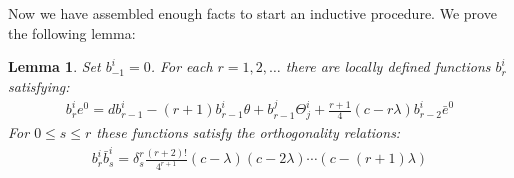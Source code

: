 \documentclass[11pt]{amsart}
\newtheorem{lem}[subsection]{Lemma}
\theoremstyle{definition}
\theoremstyle{definition}
\begin{document}
Now we have assembled enough facts to start an inductive procedure.  We prove the following lemma:

\begin{lem} Set $b^i_{-1} = 0$. For each $r = 1,2, \ldots$ there are locally defined functions $b^i_r$ satisfying:
%
\begin{align}
b^i_r e^0 = d b^i_{r-1} - (r + 1) b^i_{r-1} \theta + b^j_{r-1} \Theta^i_j + \frac{r + 1}{4} (c - r \lambda) b^i_{r-2} \bar{e}^0
\end{align}
%
For $0 \leq s \leq r$ these functions satisfy the orthogonality relations:
%
\begin{align}
b^i_r \bar{b}^i_s = \delta^r_s \frac{(r + 2)!}{4^{r + 1}} (c - \lambda)(c - 2 \lambda) \cdots (c - (r+1) \lambda)
\end{align}
%
\end{lem}
\end{document}
